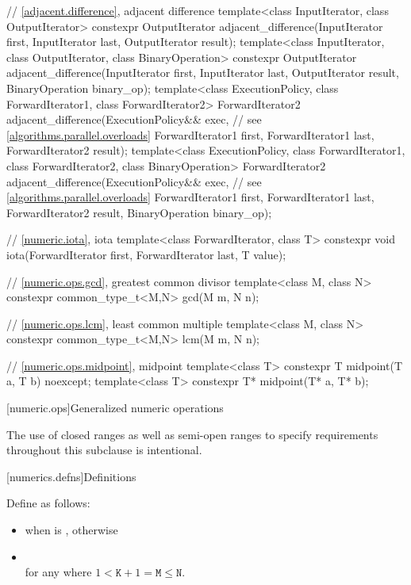 \begin{codeblock}
{  // \ref{adjacent.difference}, adjacent difference
  template<class InputIterator, class OutputIterator>
    constexpr OutputIterator
      adjacent_difference(InputIterator first, InputIterator last,
                          OutputIterator result);
  template<class InputIterator, class OutputIterator, class BinaryOperation>
    constexpr OutputIterator
      adjacent_difference(InputIterator first, InputIterator last,
                          OutputIterator result, BinaryOperation binary_op);
  template<class ExecutionPolicy, class ForwardIterator1, class ForwardIterator2>
    ForwardIterator2
      adjacent_difference(ExecutionPolicy&& exec,               // see \ref{algorithms.parallel.overloads}
                          ForwardIterator1 first, ForwardIterator1 last,
                          ForwardIterator2 result);
  template<class ExecutionPolicy, class ForwardIterator1, class ForwardIterator2,
           class BinaryOperation>
    ForwardIterator2
      adjacent_difference(ExecutionPolicy&& exec,               // see \ref{algorithms.parallel.overloads}
                          ForwardIterator1 first, ForwardIterator1 last,
                          ForwardIterator2 result, BinaryOperation binary_op);

  // \ref{numeric.iota}, iota
  template<class ForwardIterator, class T>
    constexpr void iota(ForwardIterator first, ForwardIterator last, T value);

  // \ref{numeric.ops.gcd}, greatest common divisor
  template<class M, class N>
    constexpr common_type_t<M,N> gcd(M m, N n);

  // \ref{numeric.ops.lcm}, least common multiple
  template<class M, class N>
    constexpr common_type_t<M,N> lcm(M m, N n);

  // \ref{numeric.ops.midpoint}, midpoint
  template<class T>
    constexpr T midpoint(T a, T b) noexcept;
  template<class T>
    constexpr T* midpoint(T* a, T* b);
}
\end{codeblock}

[numeric.ops]{Generalized numeric operations}

\pnum
\begin{note}
The use of closed ranges as well as semi-open ranges
to specify requirements throughout this subclause is intentional.
\end{note}

[numerics.defns]{Definitions}

%
\pnum
Define 
as follows:
\begin{itemize}
\item
{} when  is , otherwise

\item
{} \\
for any  where $1 < \mathtt{K}+1 = \mathtt{M} \leq \mathtt{N}$.
\end{itemize}

